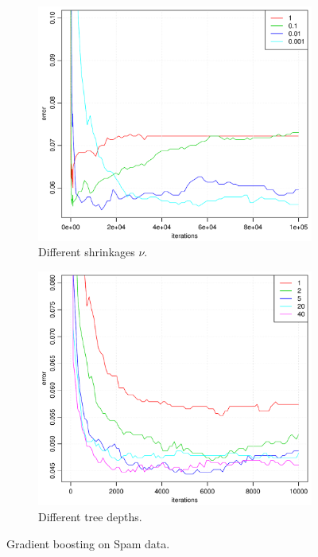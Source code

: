 \begin{figure}[htbp]
  \centering
  \begin{subfigure}[b]{0.48\textwidth}
    \includegraphics[width=\textwidth]{./figures/gradboostSpamShrink2.pdf}
    \caption{Different shrinkages $\nu$.}
    \label{fig:gradboostSpamShrink2}
  \end{subfigure}%
  \quad
  \begin{subfigure}[b]{0.48\textwidth}
    \includegraphics[width=\textwidth]{./figures/gradboostSpamDepth.pdf}
    \caption{Different tree depths.}
    \label{fig:gradboostSpamDepth}
  \end{subfigure}
  \vspace{1\baselineskip}
  \caption{Gradient boosting on Spam data.}
  \label{fig:GradBoostSpam}
\end{figure}

